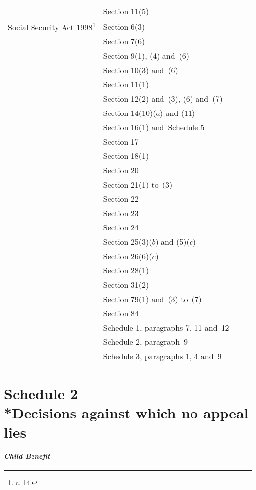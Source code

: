 \documentclass[12pt,a4paper]{article}
\begin{document}
{\begin{longtable}{p{150pt}p{102pt}p{102pt}}
&Section 11(5)\\
Social Security Act 1998\footnote{\frenchspacing 1998 c. 14.}&Section 6(3)\\
&Section 7(6)\\
&Section 9(1), (4) and~(6)\\
&Section 10(3) and~(6)\\
&Section 11(1)\\
&Section 12(2) and~(3), (6) and~(7)\\
&Section 14(10)($a$) and (11)\\
&Section 16(1) and~Schedule 5\\
&Section 17\\
&Section 18(1)\\
&Section 20\\
&Section 21(1) to~(3)\\
&Section 22\\
&Section 23\\
&Section 24\\
&Section 25(3)($b$) and (5)($c$)\\
&Section 26(6)($c$)\\
&Section 28(1)\\
&Section 31(2)\\
&Section 79(1) and~(3) to~(7)\\
&Section 84\\
&Schedule 1, paragraphs 7, 11 and~12\\
&Schedule 2, paragraph~9\\
&Schedule 3, paragraphs 1, 4 and~9\\
\end{longtable}

}

\part[Schedule 2 --- Decisions against which no appeal lies]{Schedule 2\\*Decisions against which no appeal lies}

\renewcommand\parthead{--- Schedule 2}


\subsection*{\itshape Child Benefit}
\end{document}
